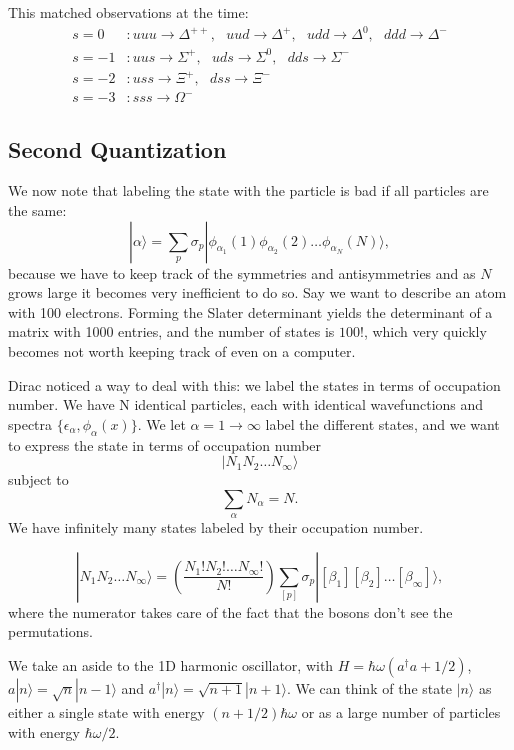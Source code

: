 \documentclass[fontsize=12pt]{scrartcl}
\newcommand{\ra}{\rangle}
\begin{document}
This matched observations at the time: \begin{align*}
s=0&: uuu\to \Delta^{++}, \ \ \ uud\to \Delta^+, \ \ \ udd \to \Delta^0, \ \ \ ddd\to \Delta^-\\
s=-1&: uus\to\Sigma^+, \ \ \ uds\to \Sigma^0, \ \ \ dds\to\Sigma^-\\
s=-2&: uss\to \Xi^+, \ \ \ dss\to\Xi^-\\
s=-3&: sss\to\Omega^-
\end{align*}

\subsection{Second Quantization}

We now note that labeling the state with the particle is bad if all particles are the same: $$|\alpha\ra = \sum_p \sigma_p|\phi_{\alpha_1}(1)\phi_{\alpha_2}(2)\dots\phi_{\alpha_N}(N)\ra,$$ because we have to keep track of the symmetries and antisymmetries and as $N$ grows large it becomes very inefficient to do so. Say we want to describe an atom with 100 electrons. Forming the Slater determinant yields the determinant of a matrix with 1000 entries, and the number of states is $100!$, which very quickly becomes not worth keeping track of even on a computer.

Dirac noticed a way to deal with this: we label the states in terms of occupation number. We have N identical particles, each with identical wavefunctions and spectra $\{\epsilon_\alpha,\phi_\alpha(x)\}$. We let $\alpha=1\to\infty$ label the different states, and we want to express the state in terms of occupation number $$|N_1N_2\dots N_\infty\ra$$ subject to $$\sum_{\alpha}N_\alpha=N.$$ We have infinitely many states labeled by their occupation number.

$$|N_1N_2\dots N_\infty\ra = \left(\frac{N_1!N_2!\dots N_\infty!}{N!}\right) \sum_{[p]}\sigma_p |[\beta_1][\beta_2]\dots[\beta_\infty]\ra,$$ where the numerator takes care of the fact that the bosons don't see the permutations.

We take an aside to the 1D harmonic oscillator, with $H=\hbar\omega(a^\dagger a+1/2)$, $a|n\ra = \sqrt{n}|n-1\ra$ and $a^\dagger|n\ra = \sqrt{n+1}|n+1\ra$. We can think of the state $|n\ra$ as either a single state with energy $(n+1/2)\hbar\omega$ or as a large number of particles with energy $\hbar\omega/2$.
\end{document}
